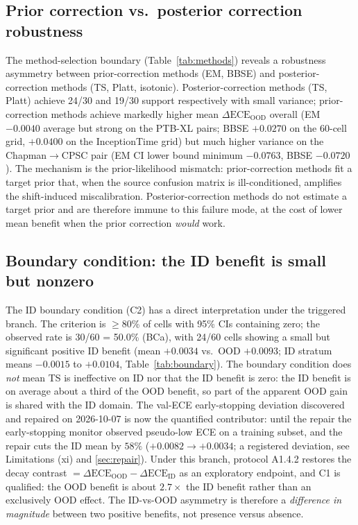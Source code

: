 \documentclass[final,5p,times,nonatbib]{elsarticle}
\begin{document}
\subsection{Prior correction vs.\ posterior correction robustness}
The method-selection boundary (Table~\ref{tab:methods}) reveals a
robustness asymmetry between prior-correction methods (EM, BBSE) and
posterior-correction methods (TS, Platt, isotonic). Posterior-correction
methods (TS, Platt) achieve 24/30 and 19/30 support respectively with
small variance; prior-correction methods achieve markedly higher mean
$\Delta\text{ECE}_{\text{OOD}}$ overall (EM $-0.0040$ average but strong
on the PTB-XL pairs; BBSE $+0.0270$ on the 60-cell grid, $+0.0400$ on
the InceptionTime grid) but much higher variance on the
Chapman$\rightarrow$CPSC pair (EM CI lower bound minimum $-0.0763$,
BBSE $-0.0720$). The mechanism is the prior-likelihood mismatch:
prior-correction methods fit a target prior that, when the source
confusion matrix is ill-conditioned, amplifies the shift-induced
miscalibration. Posterior-correction methods do not estimate a target
prior and are therefore immune to this failure mode, at the cost of
lower mean benefit when the prior correction \emph{would} work.

\subsection{Boundary condition: the ID benefit is small but nonzero}
The ID boundary condition (C2) has a direct interpretation under the
triggered branch. The criterion is $\geq$80\% of cells with 95\% CIs
containing zero; the observed rate is 30/60 = 50.0\% (BCa), with
24/60 cells showing a small but significant positive ID benefit
(mean $+0.0034$ vs.\ OOD $+0.0093$; ID stratum means $-0.0015$ to
$+0.0104$, Table~\ref{tab:boundary}). The boundary condition does
\emph{not} mean TS is ineffective on ID nor that the ID benefit is
zero: the ID benefit is on average about a third of the OOD benefit, so
part of the apparent OOD gain is shared with the ID domain. The
val-ECE early-stopping deviation discovered and repaired on
2026-10-07 is now the quantified contributor: until the repair the
early-stopping monitor observed pseudo-low ECE on a training subset,
and the repair cuts the ID mean by $58\%$
($+0.0082 \rightarrow +0.0034$; a registered deviation, see
Limitations (xi) and \ref{sec:repair}).
Under this branch, protocol A1.4.2 restores the decay contrast
$=\Delta\text{ECE}_{\text{OOD}}-\Delta\text{ECE}_{\text{ID}}$ as an
exploratory endpoint, and C1 is qualified: the OOD benefit is about
$2.7\times$ the ID benefit rather than an exclusively OOD effect. The
ID-vs-OOD asymmetry is therefore a \emph{difference in magnitude}
between two positive benefits, not presence versus absence.
\end{document}

